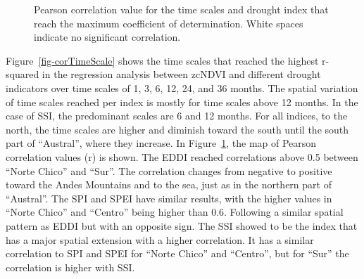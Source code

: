 \documentclass[
  authoryear,
  preprint,
  3p,
  onecolumn]{elsarticle}
\begin{document}
\begin{figure}[!ht]


\caption{\label{fig-corPerson}Pearson correlation value for the time
scales and drought index that reach the maximum coefficient of
determination. White spaces indicate no significant correlation.}

\end{figure}%

Figure~\ref{fig-corTimeScale} shows the time scales that reached the
highest r-squared in the regression analysis between zcNDVI and
different drought indicators over time scales of 1, 3, 6, 12, 24, and 36
months. The spatial variation of time scales reached per index is mostly
for time scales above 12 months. In the case of SSI, the predominant
scales are 6 and 12 months. For all indices, to the north, the time
scales are higher and diminish toward the south until the south part of
``Austral'', where they increase. In Figure~\ref{fig-corPerson}, the map
of Pearson correlation values (r) is shown. The EDDI reached
correlations above 0.5 between ``Norte Chico'' and ``Sur''. The
correlation changes from negative to positive toward the Andes Mountains
and to the sea, just as in the northern part of ``Austral''. The SPI and
SPEI have similar results, with the higher values in ``Norte Chico'' and
``Centro'' being higher than 0.6. Following a similar spatial pattern as
EDDI but with an opposite sign. The SSI showed to be the index that has
a major spatial extension with a higher correlation. It has a similar
correlation to SPI and SPEI for ``Norte Chico'' and ``Centro'', but for
``Sur'' the correlation is higher with SSI.
\end{document}
